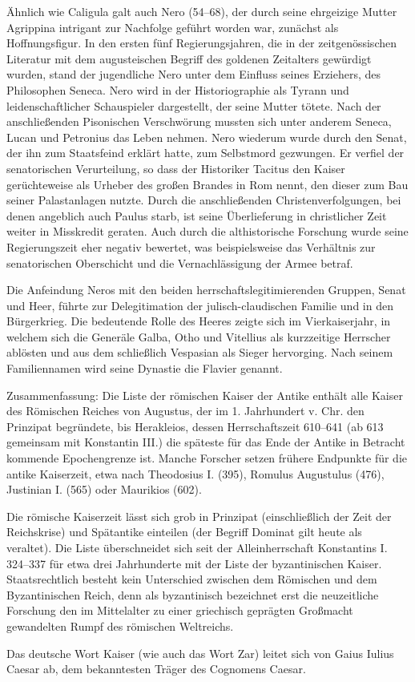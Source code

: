 Ähnlich wie \gls{Caligula} galt auch \gls{Nero} (54–68), der durch seine ehrgeizige Mutter Agrippina intrigant zur Nachfolge geführt worden war, zunächst als Hoffnungsfigur. In den ersten fünf Regierungsjahren, die in der zeitgenössischen Literatur mit dem augusteischen Begriff des goldenen Zeitalters gewürdigt wurden, stand der jugendliche Nero unter dem Einfluss seines Erziehers, des Philosophen Seneca. \gls{Nero} wird in der Historiographie als Tyrann und leidenschaftlicher Schauspieler dargestellt, der seine Mutter tötete. Nach der anschließenden Pisonischen Verschwörung mussten sich unter anderem Seneca, Lucan und Petronius das Leben nehmen. \gls{Nero} wiederum wurde durch den Senat, der ihn zum Staatsfeind erklärt hatte, zum Selbstmord gezwungen. Er verfiel der senatorischen Verurteilung, so dass der Historiker Tacitus den Kaiser gerüchteweise als Urheber des großen Brandes in Rom nennt, den dieser zum Bau seiner Palastanlagen nutzte. Durch die anschließenden Christenverfolgungen, bei denen angeblich auch Paulus starb, ist seine Überlieferung in christlicher Zeit weiter in Misskredit geraten. Auch durch die althistorische Forschung wurde seine Regierungszeit eher negativ bewertet, was beispielsweise das Verhältnis zur senatorischen Oberschicht und die Vernachlässigung der Armee betraf.

Die Anfeindung \gls{Nero}s mit den beiden herrschaftslegitimierenden Gruppen, Senat und Heer, führte zur Delegitimation der julisch-claudischen Familie und in den Bürgerkrieg. Die bedeutende Rolle des Heeres zeigte sich im Vierkaiserjahr, in welchem sich die Generäle \gls{Galba}, \gls{Otho} und \gls{Vitellius} als kurzzeitige Herrscher ablösten und aus dem schließlich Vespasian als Sieger hervorging. Nach seinem Familiennamen wird seine Dynastie die Flavier genannt.

Zusammenfassung:
Die Liste der römischen Kaiser der Antike enthält alle Kaiser des Römischen Reiches von Augustus, der im 1. Jahrhundert v. Chr. den Prinzipat begründete, bis Herakleios, dessen Herrschaftszeit 610–641 (ab 613 gemeinsam mit Konstantin III.) die späteste für das Ende der Antike in Betracht kommende Epochengrenze ist. Manche Forscher setzen frühere Endpunkte für die antike Kaiserzeit, etwa nach Theodosius I. (395), Romulus Augustulus (476), Justinian I. (565) oder Maurikios (602).

Die römische Kaiserzeit lässt sich grob in Prinzipat (einschließlich der Zeit der Reichskrise) und Spätantike einteilen (der Begriff Dominat gilt heute als veraltet). Die Liste überschneidet sich seit der Alleinherrschaft Konstantins I. 324–337 für etwa drei Jahrhunderte mit der Liste der byzantinischen Kaiser. Staatsrechtlich besteht kein Unterschied zwischen dem Römischen und dem Byzantinischen Reich, denn als byzantinisch bezeichnet erst die neuzeitliche Forschung den im Mittelalter zu einer griechisch geprägten Großmacht gewandelten Rumpf des römischen Weltreichs.

Das deutsche Wort Kaiser (wie auch das Wort Zar) leitet sich von Gaius Iulius Caesar ab, dem bekanntesten Träger des Cognomens Caesar.



 
